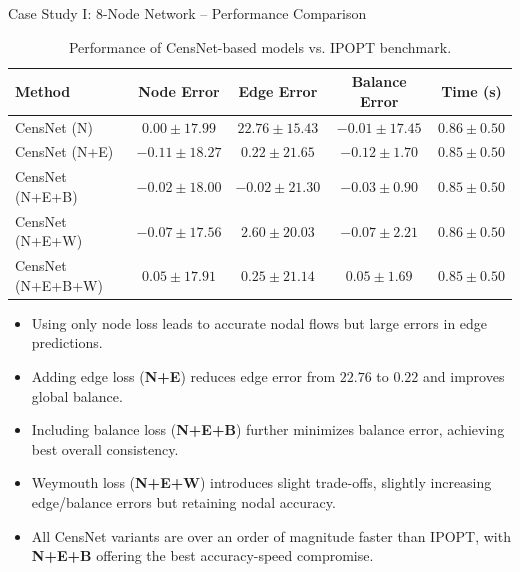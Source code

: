 \documentclass[hyperref={colorlinks,citecolor=blue,linkcolor=blue,urlcolor=blue}]{beamer}
\begin{document}
\begin{frame}{Case Study I: 8-Node Network -- Performance Comparison}
\scriptsize
\centering
\begin{table}
\captionsetup{font=scriptsize}  %
\centering
\begin{tabular}{lcccc}
\toprule
\textbf{Method} & \textbf{Node Error} & \textbf{Edge Error} & \textbf{Balance Error} & \textbf{Time (s)} \\
\midrule
CensNet (N) & $0.00 \pm 17.99$ & $22.76 \pm 15.43$ & $-0.01 \pm 17.45$ & $0.86 \pm 0.50$ \\
CensNet (N+E) & $-0.11 \pm 18.27$ & $0.22 \pm 21.65$ & $-0.12 \pm 1.70$ & $0.85 \pm 0.50$ \\
CensNet (N+E+B) & $-0.02 \pm 18.00$ & $-0.02 \pm 21.30$ & $-0.03 \pm 0.90$ & $0.85 \pm 0.50$ \\
CensNet (N+E+W) & $-0.07 \pm 17.56$ & $2.60 \pm 20.03$ & $-0.07 \pm 2.21$ & $0.86 \pm 0.50$ \\
CensNet (N+E+B+W) & $0.05 \pm 17.91$ & $0.25 \pm 21.14$ & $0.05 \pm 1.69$ & $0.85 \pm 0.50$ \\
\bottomrule
\end{tabular}
\caption{Performance of CensNet-based models vs. IPOPT benchmark.}
\end{table}

\begin{itemize}
    \item Using only node loss leads to accurate nodal flows but large errors in edge predictions.
    \item Adding edge loss (\textbf{N+E}) reduces edge error from $22.76$ to $0.22$ and improves global balance.
    \item Including balance loss (\textbf{N+E+B}) further minimizes balance error, achieving best overall consistency.
    \item Weymouth loss (\textbf{N+E+W}) introduces slight trade-offs, slightly increasing edge/balance errors but retaining nodal accuracy.
    \item All CensNet variants are over an order of magnitude faster than IPOPT, with \textbf{N+E+B} offering the best accuracy-speed compromise.
\end{itemize}

\end{frame}
\end{document}

